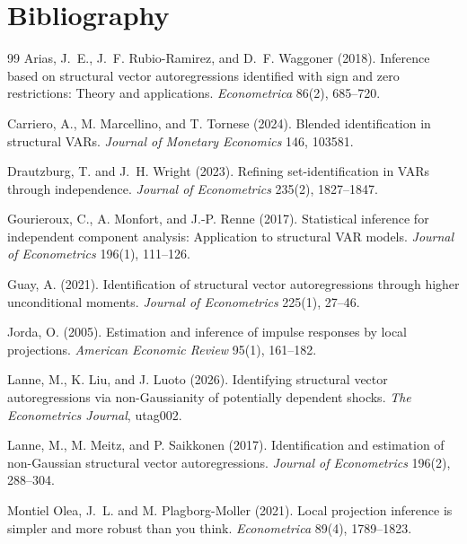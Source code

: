 \documentclass[11pt]{article}
\theoremstyle{definition}
\theoremstyle{plain}
\theoremstyle{remark}
\begin{document}
\section*{Bibliography}
\begin{thebibliography}{99}
Arias, J.~E., J.~F. Rubio-Ramirez, and D.~F. Waggoner (2018).
Inference based on structural vector autoregressions identified with sign and zero restrictions: Theory and applications.
\emph{Econometrica} 86(2), 685--720.

Carriero, A., M. Marcellino, and T. Tornese (2024).
Blended identification in structural VARs.
\emph{Journal of Monetary Economics} 146, 103581.

Drautzburg, T. and J.~H. Wright (2023).
Refining set-identification in VARs through independence.
\emph{Journal of Econometrics} 235(2), 1827--1847.

Gourieroux, C., A. Monfort, and J.-P. Renne (2017).
Statistical inference for independent component analysis: Application to structural VAR models.
\emph{Journal of Econometrics} 196(1), 111--126.

Guay, A. (2021).
Identification of structural vector autoregressions through higher unconditional moments.
\emph{Journal of Econometrics} 225(1), 27--46.

Jorda, O. (2005).
Estimation and inference of impulse responses by local projections.
\emph{American Economic Review} 95(1), 161--182.

Lanne, M., K. Liu, and J. Luoto (2026).
Identifying structural vector autoregressions via non-Gaussianity of potentially dependent shocks.
\emph{The Econometrics Journal}, utag002.

Lanne, M., M. Meitz, and P. Saikkonen (2017).
Identification and estimation of non-Gaussian structural vector autoregressions.
\emph{Journal of Econometrics} 196(2), 288--304.

Montiel Olea, J.~L. and M. Plagborg-Moller (2021).
Local projection inference is simpler and more robust than you think.
\emph{Econometrica} 89(4), 1789--1823.


\end{thebibliography}
\end{document}

